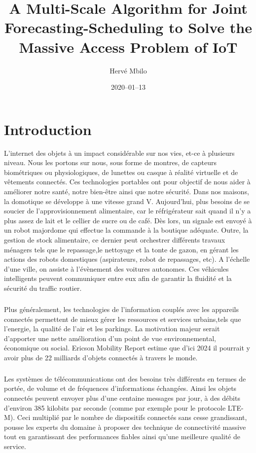 \documentclass[12pt]{article}
\title{A Multi-Scale Algorithm for Joint
Forecasting-Scheduling to Solve the Massive
Access Problem of IoT}
\author{Hervé Mbilo}
\date{2020–01–13}
\begin{document}
\maketitle

\section{Introduction}

L'internet des objets à un impact considérable sur nos vies, et-ce à plusieurs niveau.
Nous les portons sur nous, sous forme de montres, de capteurs biométriques ou physiologiques,
de lunettes ou casque à réalité virtuelle et de vêtements connectés. Ces technologies portables 
ont pour objectif de nous aider à améliorer notre santé, notre bien-être ainsi que notre sécurité.
Dans nos maisons, la domotique se développe à une vitesse grand V. Aujourd'hui, plus besoins de se soucier de l'approvisionnement alimentaire, car le réfrigérateur
sait quand il n'y a plus assez de lait et le cellier de sucre ou de café. Dès lors, un signale est envoyé à un robot majordome qui effectue 
la commande à la boutique adéquate. Outre, la gestion de stock alimentaire, ce dernier peut orchestrer différents travaux ménagers tels que le repassage,le nettoyage et la tonte de gazon,
en gérant les actions des robots domestiques (aspirateurs, robot de repassages, etc).
A l'échelle d'une ville, on assiste à l'évènement des voitures autonomes. Ces véhicules intelligents peuvent communiquer entre eux afin de garantir
la fluidité et la sécurité du traffic routier. 
\subparagraph{}Plus généralement, les technologies de l'information couplés 
avec les appareils connectés permettent de mieux gérer les ressources et services urbains,tels que l'energie, la qualité de l'air et les parkings.
La motivation majeur serait d'apporter une nette amélioration d'un point de vue environnemental, économique ou social.
Ericson Mobility Report estime que d'ici 2024 il pourrait y avoir plus de 22 milliards d'objets connectés à travers le monde.
\subparagraph{} Les systèmes de télécommunications ont des besoins très différents en termes de portée, de volume et de fréquences d'informations échangées. 
Ainsi les objets connectés peuvent envoyer plus d'une centaine messages par jour, à des débits d'environ 385 kilobits par seconde (comme par exemple pour le protocole LTE-M).
Ceci multiplié par le nombre de dispositifs connectés sans cesse grandissant, pousse les experts du domaine à proposer des technique de connectivité massive tout en garantissant des performances fiables ainsi qu'une meilleure qualité de service.
\end{document}

